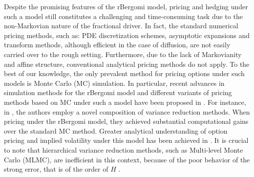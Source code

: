 Despite the promising features of the rBergomi model, pricing  and hedging under such a model still constitutes a challenging and time-consuming task due  to the non-Markovian nature of the fractional driver.  In fact, the standard numerical pricing methods, such as: PDE discretization schemes, asymptotic expansions and transform
methods, although efficient in the case of diffusion, are not easily  carried over to the rough setting. Furthermore,  due to the lack of Markovianity and affine structure, conventional analytical pricing methods  do not apply. To the best of our knowledge, the only prevalent method for pricing  options under such models is Monte Carlo (MC) simulation. In particular,  recent advances in simulation methods for the rBergomi model and different variants of pricing methods based on  MC under such a model   have been proposed in \cite{bayer2016pricing,bayer2017regularity,bennedsen2017hybrid,mccrickerd2018turbocharging,jacquier2018vix}.  For instance, in \cite{mccrickerd2018turbocharging}, the authors employ a novel composition of variance reduction methods. When pricing under the rBergomi model, they achieved substantial computational gains  over the standard MC method.  Greater   analytical understanding of option pricing and implied volatility under this model has been achieved  in \cite{jacquier2017pathwise,forde2017asymptotics,bayer2018short}.  It is crucial to note that hierarchical variance reduction methods, such
as Multi-level Monte Carlo (MLMC), are inefficient in this context, because of the poor behavior of the strong error, that is of the order of $H$ \cite{neuenkirch2016order}.

